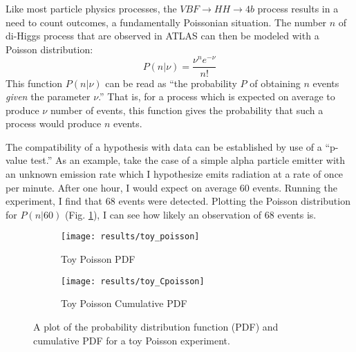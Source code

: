     Like most particle physics processes, the $VBF \to HH \to 4b$ process results in a need to count outcomes,
        a fundamentally Poissonian situation.
    The number $n$ of di-Higgs process that are observed in ATLAS can then be modeled with a Poisson distribution\cite{cranmer2015practical}:
    \begin{equation}
        P(n|\nu) = \frac{ \nu^n e^{-\nu} }{n!}
    \end{equation}
    This function $P(n|\nu)$ can be read as ``the probability $P$ of obtaining $n$ events \textit{given} the parameter $\nu$.''
    That is, for a process which is expected on average to produce $\nu$ number of events,
        this function gives the probability that such a process would produce $n$ events.

    The compatibility of a hypothesis with data can be established by use of a ``p-value test.''
    As an example, take the case of a simple alpha particle emitter with an unknown emission rate
        which I hypothesize emits radiation at a rate of once per minute.
    After one hour, I would expect on average 60 events.
    Running the experiment, I find that 68 events were detected.
    Plotting the Poisson distribution for $P(n|60)$ (Fig. \ref{fig:poisson_toy_sig:pdf}),
        I can see how likely an observation of 68 events is.
    \begin{figure}
        \centering
        \begin{subfigure}{0.48\textwidth} 
            \texttt{[image: results/toy\_poisson]}
            \caption{Toy Poisson PDF}
            \label{fig:poisson_toy_sig:pdf}
        \end{subfigure}
        \begin{subfigure}{0.48\textwidth}
            \texttt{[image: results/toy\_Cpoisson]}
            \caption{Toy Poisson Cumulative PDF}
            \label{fig:poisson_toy_sig:Cpdf}
        \end{subfigure}
        \caption{
            A plot of the probability distribution function (PDF)
                and cumulative PDF for a toy Poisson experiment.
        }
    \end{figure}

